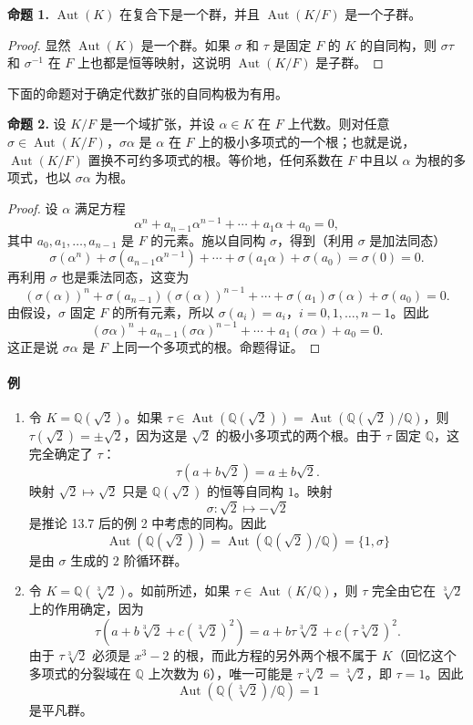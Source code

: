 \noindent\textbf{命题 1.} $\operatorname{Aut}(K)$ 在复合下是一个群，并且 $\operatorname{Aut}(K/F)$ 是一个子群。

\begin{proof}
显然 $\operatorname{Aut}(K)$ 是一个群。如果 $\sigma$ 和 $\tau$ 是固定 $F$ 的 $K$ 的自同构，则 $\sigma\tau$ 和 $\sigma^{-1}$ 在 $F$ 上也都是恒等映射，这说明 $\operatorname{Aut}(K/F)$ 是子群。
\end{proof}

下面的命题对于确定代数扩张的自同构极为有用。

\noindent\textbf{命题 2.} 设 $K/F$ 是一个域扩张，并设 $\alpha\in K$ 在 $F$ 上代数。则对任意 $\sigma\in\operatorname{Aut}(K/F)$，$\sigma\alpha$ 是 $\alpha$ 在 $F$ 上的极小多项式的一个根；也就是说，$\operatorname{Aut}(K/F)$ 置换不可约多项式的根。等价地，任何系数在 $F$ 中且以 $\alpha$ 为根的多项式，也以 $\sigma\alpha$ 为根。

\begin{proof}
设 $\alpha$ 满足方程
\[
\alpha^n+a_{n-1}\alpha^{n-1}+\cdots+a_1\alpha+a_0=0,
\]
其中 $a_0,a_1,\ldots,a_{n-1}$ 是 $F$ 的元素。施以自同构 $\sigma$，得到（利用 $\sigma$ 是加法同态）
\[
\sigma(\alpha^n)+\sigma(a_{n-1}\alpha^{n-1})+\cdots+\sigma(a_1\alpha)+\sigma(a_0)=\sigma(0)=0.
\]
再利用 $\sigma$ 也是乘法同态，这变为
\[
(\sigma(\alpha))^n+\sigma(a_{n-1})(\sigma(\alpha))^{n-1}+\cdots+
\sigma(a_1)\sigma(\alpha)+\sigma(a_0)=0.
\]
由假设，$\sigma$ 固定 $F$ 的所有元素，所以 $\sigma(a_i)=a_i$，$i=0,1,\ldots,n-1$。因此
\[
(\sigma\alpha)^n+a_{n-1}(\sigma\alpha)^{n-1}+\cdots+a_1(\sigma\alpha)+a_0=0.
\]
这正是说 $\sigma\alpha$ 是 $F$ 上同一个多项式的根。命题得证。
\end{proof}

\paragraph{例}
\begin{enumerate}[label=(\arabic*)]
\item 令 $K=\mathbb Q(\sqrt2)$。如果 $\tau\in\operatorname{Aut}(\mathbb Q(\sqrt2))=\operatorname{Aut}(\mathbb Q(\sqrt2)/\mathbb Q)$，则 $\tau(\sqrt2)=\pm\sqrt2$，因为这是 $\sqrt2$ 的极小多项式的两个根。由于 $\tau$ 固定 $\mathbb Q$，这完全确定了 $\tau$：
\[
\tau(a+b\sqrt2)=a\pm b\sqrt2.
\]
映射 $\sqrt2\mapsto\sqrt2$ 只是 $\mathbb Q(\sqrt2)$ 的恒等自同构 $1$。映射
\[
\sigma:\sqrt2\mapsto-\sqrt2
\]
是推论 13.7 后的例 2 中考虑的同构。因此
\[
\operatorname{Aut}(\mathbb Q(\sqrt2))=\operatorname{Aut}(\mathbb Q(\sqrt2)/\mathbb Q)=\{1,\sigma\}
\]
是由 $\sigma$ 生成的 $2$ 阶循环群。

\item 令 $K=\mathbb Q(\sqrt[3]{2})$。如前所述，如果 $\tau\in\operatorname{Aut}(K/\mathbb Q)$，则 $\tau$ 完全由它在 $\sqrt[3]{2}$ 上的作用确定，因为
\[
\tau(a+b\sqrt[3]{2}+c(\sqrt[3]{2})^2)=a+b\tau\sqrt[3]{2}+c(\tau\sqrt[3]{2})^2.
\]
由于 $\tau\sqrt[3]{2}$ 必须是 $x^3-2$ 的根，而此方程的另外两个根不属于 $K$（回忆这个多项式的分裂域在 $\mathbb Q$ 上次数为 $6$），唯一可能是 $\tau\sqrt[3]{2}=\sqrt[3]{2}$，即 $\tau=1$。因此
\[
\operatorname{Aut}(\mathbb Q(\sqrt[3]{2})/\mathbb Q)=1
\]
是平凡群。
\end{enumerate}

